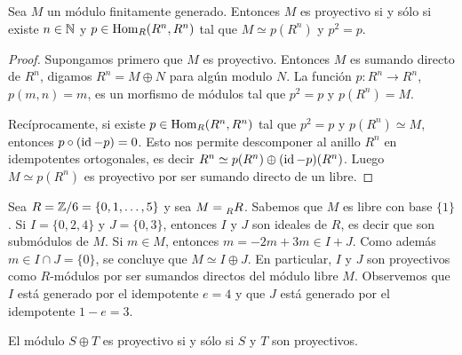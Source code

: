 \begin{proposition}
Sea $M$ un módulo finitamente generado. Entonces $M$ es proyectivo si y sólo si existe $n\in\mathbb{N}$ y $p\in\operatorname{Hom}_R(R^n,R^n)$ tal que
$M\simeq p(R^n)$ y $p^2=p$. 	
\end{proposition}

\begin{proof}
	Supongamos primero que $M$ es proyectivo. Entonces 
	$M$ es sumando directo de $R^n$, digamos $R^n=M\oplus N$ para algún modulo $N$. 
	La función $p\colon R^n\to R^n$, $p(m,n)=m$, es un morfismo 
	de módulos
	tal que $p^2=p$ y $p(R^n)=M$. 
	
	
	Recíprocamente, si existe $p\in\operatorname{Hom}_R(R^n,R^n)$ tal que $p^2=p$ y $p(R^n)\simeq M$, entonces $p\circ (\operatorname{id}-p)=0$. Esto nos
	permite descomponer al anillo $R^n$ en idempotentes ortogonales, es decir
	$R^n\simeq p(R^n)\oplus (\operatorname{id}-p)(R^n)$. Luego $M\simeq p(R^n)$ es proyectivo por ser sumando directo de un libre.  
\end{proof}

\begin{example}
Sea $R=\mathbb{Z}/6=\{0,1,\dots,5\}$ y sea $M=\prescript{}{R}R$. Sabemos que $M$ es libre con base $\{1\}$. Si $I=\{0,2,4\}$ y $J=\{0,3\}$, entonces
$I$ y $J$ son ideales de $R$, es decir que son submódulos de $M$. Si $m\in M$, entonces
$m=-2m+3m\in I+J$. Como además $m\in I\cap J=\{0\}$, se concluye que $M\simeq I\oplus J$. En particular, $I$ y $J$ son proyectivos
como $R$-módulos por ser sumandos directos del módulo libre $M$. Observemos que $I$ está generado por el idempotente
$e=4$ y que $J$ está generado por el idempotente $1-e=3$.
\end{example}


\begin{proposition}
El módulo $S\oplus T$ es proyectivo si y sólo si $S$ y $T$ son proyectivos. 	
\end{proposition}


